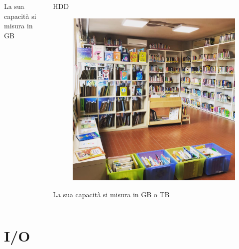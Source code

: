 \documentclass[]{beamer}
\begin{document}
\begin{frame}
\begin{columns}
\begin{column}{.3\textwidth}
\begin{center}
\begin{figure}
    \end{figure}
    La sua capacità si misura in GB
    \end{center}
\end{column}
\begin{column}{.3\textwidth}
  \begin{center}
    HDD 
    \begin{figure}
      \includegraphics[width=\columnwidth]{img/biblioteca.jpg}
    \end{figure}
    La sua capacità si misura in GB o TB
    \end{center}
\end{column}
\end{columns}
\end{frame}

\section{I/O}
\end{document}
